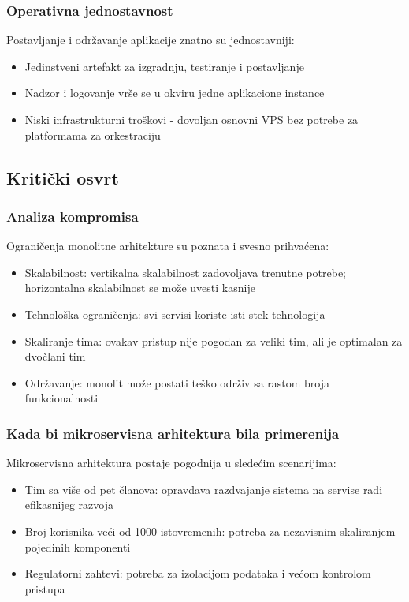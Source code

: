 \documentclass[12pt]{article}
\begin{document}
    \subsubsection*{Operativna jednostavnost}

    Postavljanje i održavanje aplikacije znatno su jednostavniji:
    \begin{itemize}
    \item Jedinstveni artefakt za izgradnju, testiranje i postavljanje
    \item Nadzor i logovanje vrše se u okviru jedne aplikacione instance
    \item Niski infrastrukturni troškovi - dovoljan osnovni VPS bez potrebe za platformama za orkestraciju
    \end{itemize}

    \newpage
    
    \subsection{Kritički osvrt}

    \subsubsection*{Analiza kompromisa}

    Ograničenja monolitne arhitekture su poznata i svesno prihvaćena:
    \begin{itemize}
    \item Skalabilnost: vertikalna skalabilnost zadovoljava trenutne potrebe; horizontalna skalabilnost se može uvesti kasnije
    \item Tehnološka ograničenja: svi servisi koriste isti stek tehnologija
    \item Skaliranje tima: ovakav pristup nije pogodan za veliki tim, ali je optimalan za dvočlani tim
    \item Održavanje: monolit može postati teško održiv sa rastom broja funkcionalnosti
    \end{itemize}

    \subsubsection*{Kada bi mikroservisna arhitektura bila primerenija}

    Mikroservisna arhitektura postaje pogodnija u sledećim scenarijima:
    \begin{itemize}
    \item Tim sa više od pet članova: opravdava razdvajanje sistema na servise radi efikasnijeg razvoja
    \item Broj korisnika veći od 1000 istovremenih: potreba za nezavisnim skaliranjem pojedinih komponenti
    \item Regulatorni zahtevi: potreba za izolacijom podataka i većom kontrolom pristupa
    \end{itemize}
\end{document}
